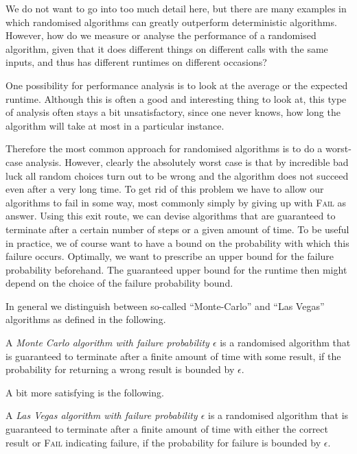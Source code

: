 We do not want to go into too much detail here, but there are many
examples in which randomised algorithms can greatly outperform
deterministic algorithms. However, how do we measure or analyse
the performance of a randomised algorithm, given that it does
different things on different calls with the same inputs, and thus
has different runtimes on different occasions?

One possibility for performance analysis is to look at the average
or the expected runtime. Although this is often a good and
interesting thing to look at, this type of analysis often stays a
bit unsatisfactory, since one never knows, how long the algorithm will
take at most in a particular instance.

Therefore the most common approach for randomised algorithms is to do a 
worst-case analysis. However, clearly the absolutely worst case is
that by incredible bad luck all random choices turn out to be wrong
and the algorithm does not succeed even after a very long time. To get
rid of this problem we have to allow our algorithms to fail in some
way, most commonly simply by giving up with \textsc{Fail} as answer.
Using this exit route, we can devise algorithms that are
guaranteed to terminate after a certain number of steps or a given
amount of time. To be useful in practice, we of course want to have a
bound on the probability with which this failure occurs. Optimally, we
want to prescribe an upper bound for the failure probability
beforehand. The guaranteed upper bound for the runtime then might
depend on the choice of the failure probability bound.

In general we distinguish between so-called ``Monte-Carlo'' and
``Las Vegas'' algorithms as defined in the following.

\begin{Def}
    A \emph{Monte Carlo algorithm with failure probability $\epsilon$}
    is a randomised algorithm that is guaranteed to terminate after
    a finite amount of time with some result, if the probability for
    returning a wrong result is bounded by $\epsilon$.
\end{Def}

A bit more satisfying is the following.

\begin{Def}
    A \emph{Las Vegas algorithm with failure probability $\epsilon$}
    is a randomised algorithm that is guaranteed to terminate after
    a finite amount of time with either the correct result or
    \textsc{Fail} indicating failure, if the probability for failure
    is bounded by $\epsilon$.
\end{Def}

